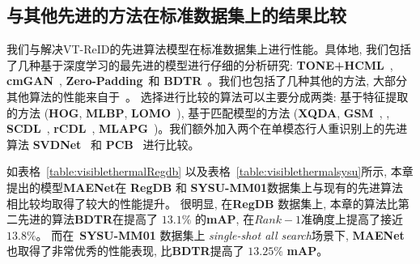 \subsection{与其他先进的方法在标准数据集上的结果比较}
我们与解决VT-ReID的先进算法模型在标准数据集上进行性能。具体地, 我们包括了几种基于深度学习的最先进的模型进行仔细的分析研究: \textbf{TONE+HCML}~\cite{ye2018hierarchical}, \textbf{cmGAN}~\cite{dai2018cross}, \textbf{Zero-Padding}~\cite{wu2017rgb}和 \textbf{BDTR}~\cite{ye2019bi}。我们也包括了几种其他的方法, 大部分其他算法的性能来自于~\cite{ye2019bi}。 选择进行比较的算法可以主要分成两类: 基于特征提取的方法 (\textbf{HOG}, \textbf{MLBP}, \textbf{LOMO}~\cite{liao2015person}), 基于匹配模型的方法 (\textbf{XQDA}, \textbf{GSM}~\cite{lin2016cross}, , \textbf{SCDL}~\cite{wang2012semi}, \textbf{rCDL}~\cite{huang2013coupled}, \textbf{MLAPG}~\cite{liao2015efficient})。我们额外加入两个在单模态行人重识别上的先进算法 \textbf{SVDNet}~\cite{sun2017svdnet} 和 \textbf{PCB}~\cite{sun2018beyond} 进行比较。\par
如表格~\ref{table:visiblethermalRegdb} 以及表格~\ref{table:visiblethermalsysu}所示, 本章提出的模型\textbf{MAENet}在 \textbf{RegDB} 和 \textbf{SYSU-MM01}数据集上与现有的先进算法相比较均取得了较大的性能提升。 很明显, 在\textbf{RegDB} 数据集上, 本章的算法比第二先进的算法\textbf{BDTR}在提高了 $13.1 \%$
的\textbf{mAP}, 在$Rank-1$准确度上提高了接近$13.8 \%$。 而在~\textbf{SYSU-MM01} 数据集上 \textit{single-shot all search}场景下, \textbf{MAENet} 也取得了非常优秀的性能表现, 比\textbf{BDTR}提高了 $13.25 \%$ \textbf{mAP}。

